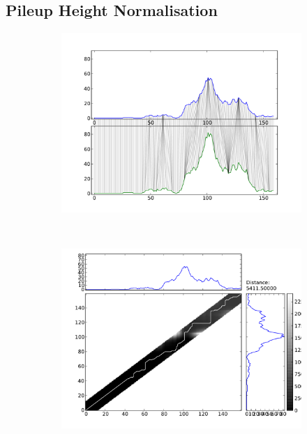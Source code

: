 \documentclass[parskip]{cs4rep}
\begin{document}
\subsection{Pileup Height Normalisation}
\label{sec:pileup_height_normalisation}
\begin{figure}
   \centering
   \begin{subfigure}[b]{0.3\textwidth}
       \includegraphics[width=\textwidth]{figures/methods/pileup_normalisation/mappings_x_1_5_x.pdf}
       \caption{}
       \label{fig:pileup_normalisation:mappings_unnormalised}
   \end{subfigure}
   ~
   \begin{subfigure}[b]{0.3\textwidth}
       \includegraphics[width=\textwidth]{figures/methods/pileup_normalisation/cost_x_1_5_x.pdf}

\end{subfigure}
\end{figure}
\end{document}
